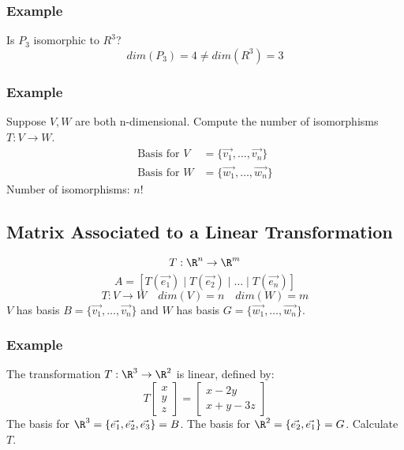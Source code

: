 \documentclass{math}
\begin{document}
\subsubsection*{Example}
Is \( P_3 \) isomorphic to \( R^3 \)?
\[ dim(P_3) = 4 \ne dim(R^3) = 3 \]

\subsubsection*{Example}
Suppose \( V,W \) are both n-dimensional. Compute the number of isomorphisms
\( T:V\to W \).
\begin{align*}
  \text{Basis for } V &= \{\vec{v_1},\dots,\vec{v_n}\} \\
  \text{Basis for } W &= \{\vec{w_1},\dots,\vec{w_n}\}
\end{align*}
Number of isomorphisms: \( n! \)

\subsection*{Matrix Associated to a Linear Transformation}
\[ T:\R^n\to\R^m \]
\[ A = [T(\vec{e_1})\mid T(\vec{e_2})\mid\dots\mid T(\vec{e_n})] \]
\[ T:V\to W \quad dim(V) = n \quad dim(W) = m \]
\( V \) has basis \( B = \{\vec{v_1},\dots,\vec{v_n}\} \) and \( W \) has basis
\( G = \{\vec{w_1},\dots,\vec{w_n}\} \).
\begin{center}
\end{center}

\subsubsection*{Example}
The transformation \( T:\R^3\to\R^2 \) is linear, defined by:
\[ T\begin{bmatrix}x \\ y \\ z\end{bmatrix} =
  \begin{bmatrix}x-2y \\ x+y-3z\end{bmatrix} \]
The basis for \( \R^3 = \{\vec{e_1},\vec{e_2},\vec{e_3}\} = B \).
The basis for \( \R^2 = \{\vec{e_2},\vec{e_1}\} = G \). Calculate \( T \).
\end{document}
